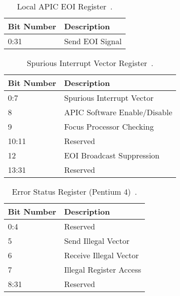 \begin{table}[H]
  \centering
  \begin{tabularx}{1.0\textwidth}{| X | X |}
    \hline
    \textbf{Bit Number} & \textbf{Description} \\ \hline\hline
    0:31                & Send EOI Signal      \\ \hline
  \end{tabularx}
  \caption{Local APIC EOI Register~\autocite[sec.~3.11.8.5]{ia32}.}
  \label{tab:lapicregseoi}
\end{table}

\begin{table}[H]
  \centering
  \begin{tabularx}{1.0\textwidth}{| X | X |}
    \hline
    \textbf{Bit Number} & \textbf{Description}         \\ \hline\hline
    0:7                 & Spurious Interrupt Vector    \\ \hline
    8                   & APIC Software Enable/Disable \\ \hline
    9                   & Focus Processor Checking     \\ \hline
    10:11               & Reserved                     \\ \hline
    12                  & EOI Broadcast Suppression    \\ \hline
    13:31               & Reserved                     \\ \hline
  \end{tabularx}
  \caption{Spurious Interrupt Vector Register~\autocite[sec.~3.11.9]{ia32}.}
  \label{tab:lapicregssvr}
\end{table}

\begin{table}[H]
  \centering
  \begin{tabularx}{1.0\textwidth}{| X | X |}
    \hline
    \textbf{Bit Number} & \textbf{Description}    \\ \hline\hline
    0:4                 & Reserved                \\ \hline
    5                   & Send Illegal Vector     \\ \hline
    6                   & Receive Illegal Vector  \\ \hline
    7                   & Illegal Register Access \\ \hline
    8:31                & Reserved                \\ \hline
  \end{tabularx}
  \caption{Error Status Register (Pentium 4)~\autocite[sec.~3.11.5.3]{ia32}.}
  \label{tab:lapicregsesr}
\end{table}

